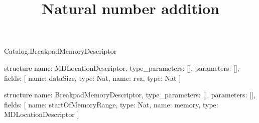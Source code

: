 \begin{lexlean}{Catalog.BreakpadMemoryDescriptor}
\title{Natural number addition}
\begin{semanticmodule}
structure{
  name: MDLocationDescriptor,
  type_parameters: [],
  parameters: [],
  fields: [
    {name: dataSize, type: Nat},
    {name: rva, type: Nat}
  ]
}

structure{
  name: BreakpadMemoryDescriptor,
  type_parameters: [],
  parameters: [],
  fields: [
    {name: startOfMemoryRange, type: Nat},
    {name: memory, type: MDLocationDescriptor}
  ]
}
\end{semanticmodule}
\end{lexlean}
